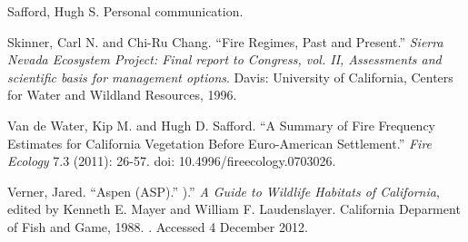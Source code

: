 \begin{hangparas}{.25in}{1}
Safford, Hugh S. Personal communication.

Skinner, Carl N. and Chi-Ru Chang. ``Fire Regimes, Past and Present.'' \emph{Sierra Nevada Ecosystem Project: Final report to Congress, vol. II, Assessments and scientific basis for management options}. Davis: University of California, Centers for Water and Wildland Resources, 1996.

Van de Water, Kip M. and Hugh D. Safford. ``A Summary of Fire Frequency Estimates for California Vegetation Before Euro-American Settlement.'' \emph{Fire Ecology} 7.3 (2011): 26-57. doi: 10.4996/fireecology.0703026.

Verner, Jared. ``Aspen (ASP).'' ).'' \emph{A Guide to Wildlife Habitats of California}, edited by Kenneth E. Mayer and William F. Laudenslayer. California Deparment of Fish and Game, 1988. . Accessed 4 December 2012.


\end{hangparas}

